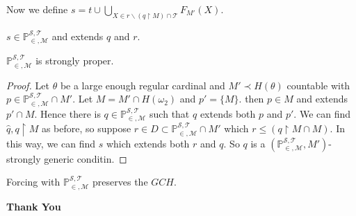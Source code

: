 \documentclass[10pt]{beamer}
\newcommand{\fn}{\mathbb{P}_{\in, \mathcal{M}}^{\mathcal{S}, \mathcal{T}}}
\newcommand{\mt}{\mathcal{T}}
\newcommand{\rest}{{\restriction}}
\begin{document}
\begin{frame}
Now we define $s=t \cup \bigcup_{X \in r\backslash (q \rest M) \cap \mt}F_{M'}(X)$.
\begin{lemma}
$s \in \fn$ and extends $q$ and $r$.
\end{lemma}
\begin{theorem}
$\fn$ is strongly proper.
\end{theorem}
\vspace{-4mm}
\begin{proof}
Let $\theta$ be a large enough regular cardinal and $M' \prec H(\theta)$ countable with $p \in \fn \cap M'$. Let $M=M' \cap H(\omega_2)$ and $p'=\{M\}$. then $p \in M$ and extends $p' \cap M$. Hence there is $q \in \fn$ such that $q$ extends both $p$ and $p'$. We can find $\hat{q}, q \rest M$ as before, so suppose $r \in D \subset \fn \cap M'$ which $r \leq (q\rest M \cap M)$. In this way, we can find $s$ which extends both $r$ and $q$. So $q$ is a $(\fn, M')$-strongly generic conditin.
\end{proof}
\end{frame}
\begin{frame}
\begin{theorem}
Forcing with $\fn$ preserves the $GCH$.
\end{theorem}
\end{frame}
\begin{frame}
\begin{center}
\textbf{{\Huge Thank You}}
\end{center}
\end{frame}
\end{document}

